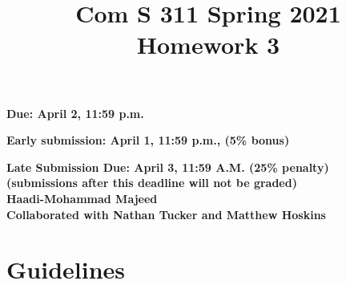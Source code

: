 \documentclass[11pt]{amsart}
\begin{document}


\title{
Com S 311 Spring 2021\\
Homework 3
}

\maketitle


\vspace{-.8cm}
\begin{center}
{\bf Due:  April 2, 11:59 p.m.}

\smallskip
\textbf{Early submission: April 1, 11:59 p.m., (5\% bonus)}

\smallskip
{\bf Late Submission Due: April 3, 11:59 \textbf{A.M.} (25\% penalty)\\
(submissions after this deadline will not be graded)}
\textbf{\\Haadi-Mohammad Majeed\\Collaborated with Nathan Tucker and Matthew Hoskins} 
\end{center}

\medskip

\section*{\large Guidelines}
\end{document}
